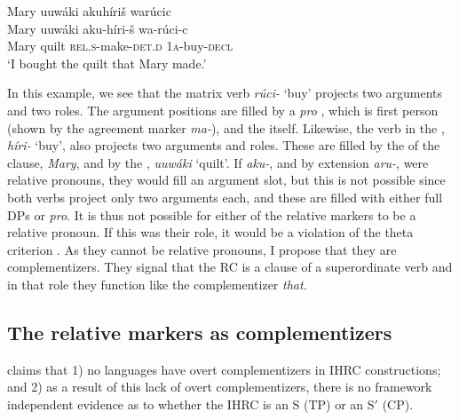 \documentclass[output=paper]{LSP/langsci}
\begin{document}
\ea \label{boyle25}
 \glll Mary uuw\'aki akuh\'iri\v{s} war\'ucic\\
Mary uuw\'aki aku-h\'iri-\v{s}         wa-r\'uci-c\\
Mary quilt   \textsc{rel.s}-make-\textsc{det.d} \textsc{1a}-buy-\textsc{decl}\\
\trans `I bought the quilt that Mary made.' 
\z

In this example, we see that the matrix verb \textit{r\'uci-} `buy' projects two arguments and two  roles. The argument positions are filled by a \textit{pro} , which is first person (shown by the agreement marker \textit{ma-}), and the  itself. Likewise, the verb in the , \textit{h\'iri-} `buy', also projects two arguments and  roles. These are filled by the  of the clause, \textit{Mary}, and by the , \textit{uuw\'aki} `quilt'. If \textit{aku-}, and by extension \textit{aru-}, were relative pronouns, they would fill an argument slot, but this is not possible since both verbs project only two arguments each, and these are filled with either full DPs or \textit{pro}. It is thus not possible for either of the  relative markers to be a relative pronoun. If this was their role, it would be a violation of the theta criterion \citep[36]{Chomsky1981}. As they cannot be relative pronouns, I propose that they are complementizers. They signal that the RC is a  clause of a superordinate verb and in that role they function like the  complementizer \textit{that}. 

\subsection{The  relative markers as complementizers}\label{sec:boyle:5.2}

\citet{Culy1990} claims that 1) no languages have overt complementizers in IHRC constructions; and 2) as a result of this lack of overt complementizers, there is no framework independent evidence as to whether the IHRC is an S (TP) or an S$'$ (CP).  
\end{document}
